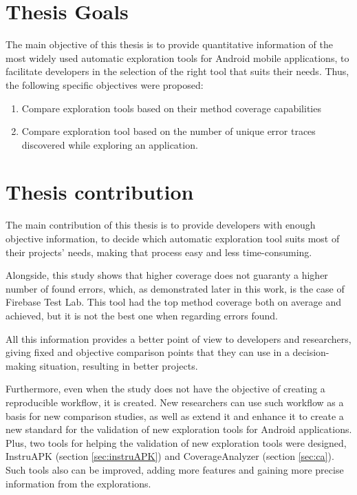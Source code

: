 \section{Thesis  Goals}\label{sec:thesisGoals}

The main objective of this thesis is to provide quantitative information of the most widely used automatic exploration tools for Android mobile applications, to facilitate developers in the selection of the right tool that suits their needs. Thus, the following specific objectives were proposed:

		\begin{enumerate}
			\item Compare exploration tools  based on their method  coverage capabilities
			\item Compare exploration tool based on the number of unique error traces discovered while exploring an application.
		\end{enumerate}

\section{Thesis contribution} \label{sec:thesisContribution}

The main contribution of this thesis is to provide developers with enough objective information, to decide which automatic exploration tool suits most of their projects' needs, making that process easy and less time-consuming.

Alongside, this study shows that higher coverage does not guaranty a higher number of found errors, which, as demonstrated later in this work, is the case of Firebase Test Lab. This tool had the top method coverage both on average and achieved, but it is not the best one when regarding errors found. 

All this information provides a better point of view to developers and researchers, giving fixed and objective comparison points that they can use in a decision-making situation, resulting in better projects. 

Furthermore, even when the study does not have the objective of creating a reproducible workflow, it is created. New researchers can use such workflow as a basis for new comparison studies, as well as extend it and enhance it to create a new standard for the validation of new exploration tools for Android applications. Plus, two tools for helping the validation of new exploration tools were designed, InstruAPK (section \ref{sec:instruAPK}) and CoverageAnalyzer (section \ref{sec:ca}). Such tools also can be improved, adding more features and gaining more precise information from the explorations.

